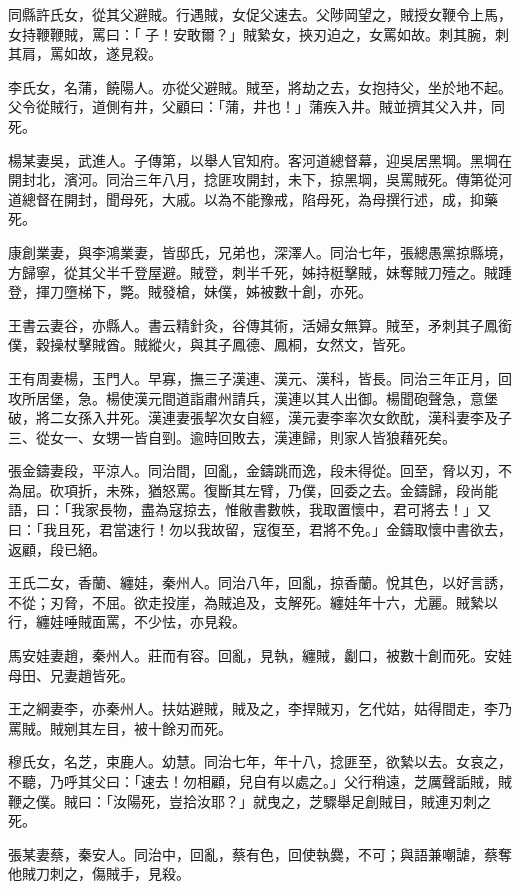 \begin{pinyinscope}
同縣許氏女，從其父避賊。行遇賊，女促父速去。父陟岡望之，賊授女鞭令上馬，女持鞭鞭賊，罵曰：「子！安敢爾？」賊縶女，挾刃迫之，女罵如故。刺其腕，刺其肩，罵如故，遂見殺。

李氏女，名蒲，饒陽人。亦從父避賊。賊至，將劫之去，女抱持父，坐於地不起。父令從賊行，道側有井，父顧曰：「蒲，井也！」蒲疾入井。賊並擠其父入井，同死。

楊某妻吳，武進人。子傳第，以舉人官知府。客河道總督幕，迎吳居黑堈。黑堈在開封北，濱河。同治三年八月，捻匪攻開封，未下，掠黑堈，吳罵賊死。傳第從河道總督在開封，聞母死，大戚。以為不能豫戒，陷母死，為母撰行述，成，抑藥死。

康創業妻，與李鴻業妻，皆邸氏，兄弟也，深澤人。同治七年，張總愚黨掠縣境，方歸寧，從其父半千登屋避。賊登，刺半千死，姊持梃擊賊，妹奪賊刀殪之。賊踵登，揮刀墮梯下，斃。賊發槍，妹僕，姊被數十創，亦死。

王書云妻谷，亦縣人。書云精針灸，谷傳其術，活婦女無算。賊至，矛刺其子鳳銜僕，穀操杖擊賊酋。賊縱火，與其子鳳德、鳳桐，女然文，皆死。

王有周妻楊，玉門人。早寡，撫三子漢連、漢元、漢科，皆長。同治三年正月，回攻所居堡，急。楊使漢元間道詣肅州請兵，漢連以其人出御。楊聞砲聲急，意堡破，將二女孫入井死。漢連妻張挈次女自經，漢元妻李率次女飲酖，漢科妻李及子三、從女一、女甥一皆自剄。逾時回敗去，漢連歸，則家人皆狼藉死矣。

張金鑄妻段，平涼人。同治間，回亂，金鑄跳而逸，段未得從。回至，脅以刃，不為屈。砍項折，未殊，猶怒罵。復斷其左臂，乃僕，回委之去。金鑄歸，段尚能語，曰：「我家長物，盡為寇掠去，惟敝書數帙，我取置懷中，君可將去！」又曰：「我且死，君當速行！勿以我故留，寇復至，君將不免。」金鑄取懷中書欲去，返顧，段已絕。

王氏二女，香蘭、纏娃，秦州人。同治八年，回亂，掠香蘭。悅其色，以好言誘，不從；刃脅，不屈。欲走投崖，為賊追及，支解死。纏娃年十六，尤麗。賊縶以行，纏娃唾賊面罵，不少怯，亦見殺。

馬安娃妻趙，秦州人。莊而有容。回亂，見執，纏賊，劙口，被數十創而死。安娃母田、兄妻趙皆死。

王之綱妻李，亦秦州人。扶姑避賊，賊及之，李捍賊刃，乞代姑，姑得間走，李乃罵賊。賊剜其左目，被十餘刃而死。

穆氏女，名芝，束鹿人。幼慧。同治七年，年十八，捻匪至，欲縶以去。女哀之，不聽，乃呼其父曰：「速去！勿相顧，兒自有以處之。」父行稍遠，芝厲聲詬賊，賊鞭之僕。賊曰：「汝陽死，豈拾汝耶？」就曳之，芝驟舉足創賊目，賊連刃刺之死。

張某妻蔡，秦安人。同治中，回亂，蔡有色，回使執爨，不可；與語兼嘲謔，蔡奪他賊刀刺之，傷賊手，見殺。


\end{pinyinscope}
